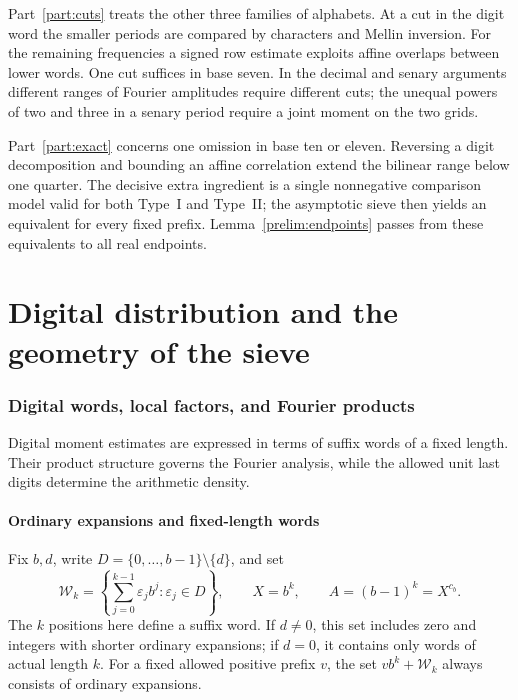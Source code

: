 \documentclass[11pt,a4paper]{article}
\theoremstyle{paperplain}
\numberwithin{equation}{section}
\begin{document}
Part~\ref{part:cuts} treats the other three families of alphabets. At a cut in the
digit word the smaller periods are compared by characters and Mellin
inversion. For the remaining frequencies a signed row estimate exploits
affine overlaps between lower words. One cut suffices in base seven.
In the decimal and senary arguments different ranges of Fourier
amplitudes require different cuts; the unequal powers of two and
three in a senary period require a joint moment on the two grids.

Part~\ref{part:exact} concerns one omission in base ten or eleven.
Reversing a digit decomposition and bounding an affine correlation
extend the bilinear range below one quarter. The decisive extra
ingredient is a single nonnegative comparison model valid for both
Type~I and Type~II; the asymptotic sieve then yields an equivalent
for every fixed prefix. Lemma~\ref{prelim:endpoints} passes from
these equivalents to all real endpoints.

\clearpage
\part{Digital distribution and the geometry of the sieve}\label{part:framework}
\section{Digital words, local factors, and Fourier products}
\label{sec:preliminaries}

Digital moment estimates are expressed in terms of suffix words of a fixed
length. Their product structure governs the Fourier analysis, while the
allowed unit last digits determine the arithmetic density.

\subsection{Ordinary expansions and fixed-length words}

Fix $b,d$, write $D=\{0,\ldots,b-1\}\setminus\{d\}$, and set
\[
 \mathcal W_k=\left\{\sum_{j=0}^{k-1}\varepsilon_jb^j:
                 \varepsilon_j\in D\right\},\qquad X=b^k,
 \qquad A=(b-1)^k=X^{c_b}.
\]
The $k$ positions here define a suffix word. If $d\ne0$, this set includes
zero and integers with shorter ordinary expansions; if $d=0$, it contains
only words of actual length $k$. For a fixed allowed positive prefix $v$,
the set $v b^k+\mathcal W_k$ always consists of ordinary expansions.
\end{document}
